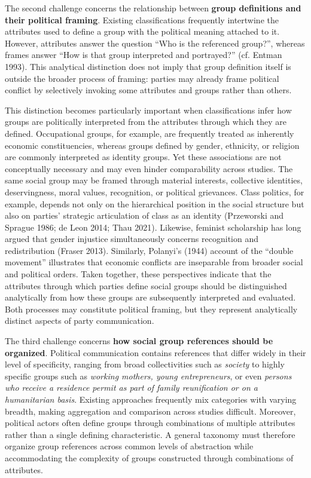 \documentclass[12pt]{article}
\begin{document}
The second challenge concerns the relationship between \textbf{group definitions and their political framing}.
Existing classifications frequently intertwine the attributes used to define a group with the political meaning attached to it.
However, attributes answer the question ``Who is the referenced group?'', whereas frames answer ``How is that group interpreted and portrayed?'' (cf. Entman 1993). This analytical distinction does not imply that group definition itself is outside the broader process of framing: parties may already frame political conflict by selectively invoking some attributes and groups rather than others.

This distinction becomes particularly important when classifications infer how groups are politically interpreted from the attributes through which they are defined.
Occupational groups, for example, are frequently treated as inherently economic constituencies, whereas groups defined by gender, ethnicity, or religion are commonly interpreted as identity groups.
Yet these associations are not conceptually necessary and may even hinder comparability across studies.
The same social group may be framed through material interests, collective identities, deservingness, moral values, recognition, or political grievances.
Class politics, for example, depends not only on the hierarchical position in the social structure but also on parties' strategic articulation of class as an identity (Przeworski and Sprague 1986; de Leon 2014; Thau 2021).
Likewise, feminist scholarship has long argued that gender injustice simultaneously concerns recognition and redistribution (Fraser 2013).
Similarly, Polanyi's (1944) account of the ``double movement'' illustrates that economic conflicts are inseparable from broader social and political orders.
Taken together, these perspectives indicate that the attributes through which parties define social groups should be distinguished analytically from how these groups are subsequently interpreted and evaluated.
Both processes may constitute political framing, but they represent analytically distinct aspects of party communication.

The third challenge concerns \textbf{how social group references should be organized}.
Political communication contains references that differ widely in their level of specificity, ranging from broad collectivities such as \emph{society} to highly specific groups such as \emph{working mothers, young entrepreneurs}, or even \emph{persons who receive a residence permit as part of family reunification or on a humanitarian basis}.
Existing approaches frequently mix categories with varying breadth, making aggregation and comparison across studies difficult.
Moreover, political actors often define groups through combinations of multiple attributes rather than a single defining characteristic.
A general taxonomy must therefore organize group references across common levels of abstraction while accommodating the complexity of groups constructed through combinations of attributes.
\end{document}
